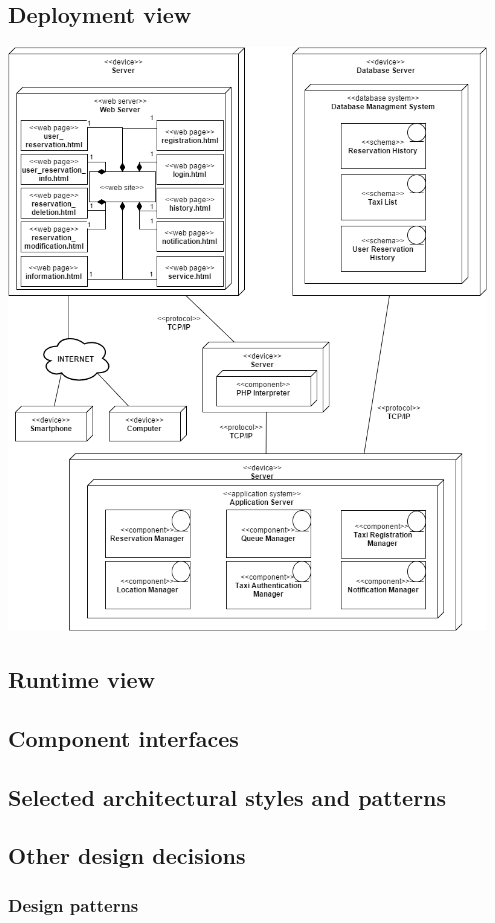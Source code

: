 \subsection{Deployment view}
	\begin{center}
		\includegraphics[width=0.95\textwidth]{./images/deployment_view.png}
	\end{center}
\subsection{Runtime view}
\subsection{Component interfaces}
\subsection{Selected architectural styles and patterns}
\subsection{Other design decisions}
	\subsubsection{Design patterns}